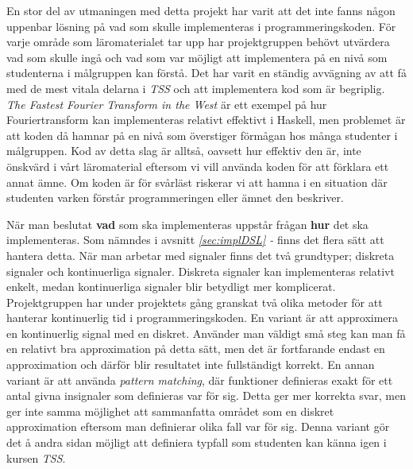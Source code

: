 \documentclass[12pt,a4paper,twoside,openright]{article}
\begin{document}
En stor del av utmaningen med detta projekt har varit att det inte
fanns någon uppenbar lösning på vad som skulle implementeras i
programmeringskoden. För varje område som läromaterialet tar upp har
projektgruppen behövt utvärdera vad som skulle ingå och vad som var
möjligt att implementera på en nivå som studenterna i målgruppen kan
förstå. Det har varit en ständig avvägning av att få med de mest
vitala delarna i \textit{TSS} och att implementera kod som är
begriplig. \textit{The Fastest Fourier Transform in the West}
\cite{fastestfourier} %
är ett exempel på hur Fouriertransform kan implementeras relativt
effektivt i Haskell, men problemet är att koden då hamnar på en nivå
som överstiger förmågan hos många studenter i målgruppen. Kod av detta
slag är alltså, oavsett hur effektiv den är, inte önskvärd i vårt
läromaterial eftersom vi vill använda koden för att förklara ett annat
ämne. Om koden är för svårläst riskerar vi att hamna i en situation
där studenten varken förstår programmeringen eller ämnet den
beskriver.

När man beslutat \textbf{vad} som ska implementeras uppstår frågan
\textbf{hur} det ska implementeras. Som nämndes i
avsnitt \textit{\ref{sec:implDSL} - }
finns det flera sätt att hantera detta. När man arbetar med signaler
finns det två grundtyper; diskreta signaler och kontinuerliga
signaler. Diskreta signaler kan implementeras relativt enkelt, medan
kontinuerliga signaler blir betydligt mer komplicerat. Projektgruppen
har under projektets gång granskat två olika metoder för att hanterar
kontinuerlig tid i programmeringskoden. En variant är att approximera
en kontinuerlig signal med en diskret. Använder man väldigt små steg
kan man få en relativt bra approximation på detta sätt, men det är
fortfarande endast en approximation och därför blir resultatet inte
fullständigt korrekt.
En annan variant är att använda \textit{pattern matching}, där
funktioner definieras exakt för ett antal givna insignaler som
definieras var för sig. Detta ger mer korrekta svar, men ger inte
samma möjlighet att
sammanfatta
området som en diskret approximation eftersom man definierar
olika fall var för sig. Denna
variant gör det å andra sidan möjligt att definiera typfall som
studenten kan känna igen i kursen \textit{TSS}.
\end{document}
